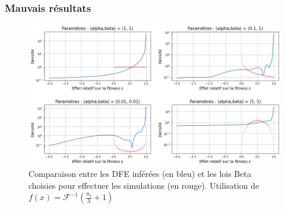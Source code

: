 \documentclass{beamer}
\newcommand{\pth}[1]{\left(#1\right)}
\newcommand{\dr}{\partial}
\newcommand{\fr}{\mathcal{F}}
\begin{document}
%
%
%
%
%
%


\begin{frame}
  \frametitle{Mauvais résultats}
  
  \begin{figure}[h]
    \begin{center}
      \includegraphics[width=0.9\linewidth]{../Img/DFE_inferred.png}
    \end{center}
    \caption{\label{fig:DFE}Comparaison entre les DFE inférées (en bleu) et les lois Beta choisies pour effectuer les simulations (en rouge). Utilisation de $f(x)=\fr^{-1}\pth{\frac{a_{\xi}}{\lambda}+1}$}
  \end{figure}


\end{frame}

%  
%
%
\end{document}
